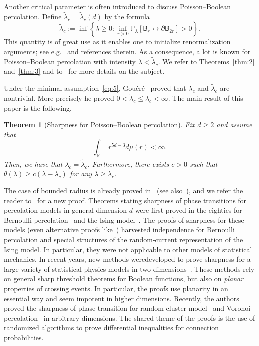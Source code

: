 \documentclass[10pt]{amsart}
\newtheorem{theo}{Theorem}[section]
\theoremstyle{definition}\newtheorem{defi}[theo]{Definition}\newtheorem{rema}[theo]{Remark}\newtheorem{exam}[theo]{Example}\newtheorem{exem}[theo]{Example}\newtheorem{nota}[theo]{Notation}
\begin{document}
Another critical parameter is often introduced to discuss Poisson--Boolean percolation. Define $\widetilde\lambda_c=\widetilde\lambda_c(d)$ by the formula
\[
\widetilde\lambda_c:=\inf\left\{\lambda\ge0:\inf_{r>0}{\mathbb P}_\lambda[\mathsf B_r\stackrel{}{\longleftrightarrow}\partial\mathsf B_{2r}]>0\right\}.
\]
This quantity is of great use as it enables one to initialize renormalization arguments; see e.g.~\cite{Gou1,Gou2} and references therein. As a consequence, a lot is known for Poisson--Boolean percolation with intensity $\lambda<\widetilde\lambda_c$. We refer to Theorems~\ref{thm:2} and~\ref{thm:3} and to~\cite{MeeRoy08} for more details on the subject.

Under the minimal assumption~\eqref{eq:5}, Gouéré~\cite{Gou1} proved that $\lambda_c$ and $\widetilde{\lambda}_c$ are nontrivial. More precisely he proved $0<\widetilde\lambda_c\le\lambda_c <\infty$. The main result of this paper is the following.
\begin{theo}[Sharpness for Poisson--Boolean percolation]\label{thm:main}
Fix $d\ge2$ and assume that
\begin{equation}
\int_{{\mathbb R}_+} r^{5d-3}d\mu(r)<\infty.\label{eq:7}
\end{equation}
Then, we have that $\lambda_c=\widetilde\lambda_c$. Furthermore, there exists $c>0$ such that $\theta(\lambda)\ge c(\lambda-\lambda_c)$ for any $\lambda\ge \lambda_c$.
\end{theo}



The case of bounded radius is already proved in~\cite{meester1994nonuniversality,zuev1985continuous} (see also~\cite{MeeRoy08}), and we refer the reader to~\cite{Zie16} for a new proof. Theorems stating sharpness of phase transitions for percolation models in general dimension $d$ were first proved in the eighties for Bernoulli percolation~\cite{AizBar87,Men86} and the Ising model~\cite{AizBarFer87}. The proofs of sharpness for these models (even alternative proofs like~\cite{DumTas15}) harvested independence for Bernoulli percolation and special structures of the random-current representation of the Ising model. In particular, they were not applicable to other models of statistical mechanics. In recent years, new methods were\linebreak developed to prove sharpness for a large variety of statistical physics models in two dimensions~\cite{ahlberg2016sharpness,BefDum12,BolRio06}. These methods rely on general sharp threshold theorems for Boolean functions, but also on \emph{planar} properties of crossing events. In particular, the proofs use planarity in an essential way and seem impotent in higher dimensions. Recently, the authors proved the sharpness of phase transition for random-cluster model~\cite{DumRaoTas16a} and Voronoi percolation~\cite{DumRaoTas16b} in arbitrary dimensions. The shared theme of the proofs is the use of randomized algorithms to prove differential inequalities for connection probabilities.
\end{document}
